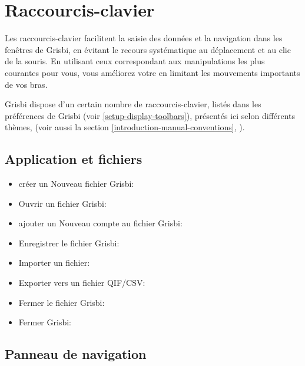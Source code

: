 \section{Raccourcis-clavier\label{home-shortcuts}}


Les raccourcis-clavier facilitent la saisie des données et la navigation dans les fenêtres de Grisbi, en évitant le recours systématique au déplacement et au clic de la souris. En utilisant ceux correspondant aux manipulations les plus courantes pour vous, vous améliorez votre  en limitant les mouvements importants de vos bras.
 
Grisbi dispose d'un certain nombre de raccourcis-clavier, listés dans les préférences de Grisbi (voir \vref{setup-display-toolbars}), présentés ici selon différents thèmes, (voir aussi la section \vref{introduction-manual-conventions}, ).


\subsection{Application et fichiers}

\begin{itemize}
	\item créer un Nouveau fichier Grisbi: 
	\item Ouvrir un fichier Grisbi: 
	\item ajouter un Nouveau compte au fichier Grisbi: 
	\item Enregistrer le fichier Grisbi: 
	\item Importer un fichier: 
	\item Exporter vers un fichier \gls{QIF}/\gls{CSV}: 
	\item Fermer le fichier Grisbi: 
	\item Fermer Grisbi: 
\end{itemize}


\subsection{Panneau de navigation}

